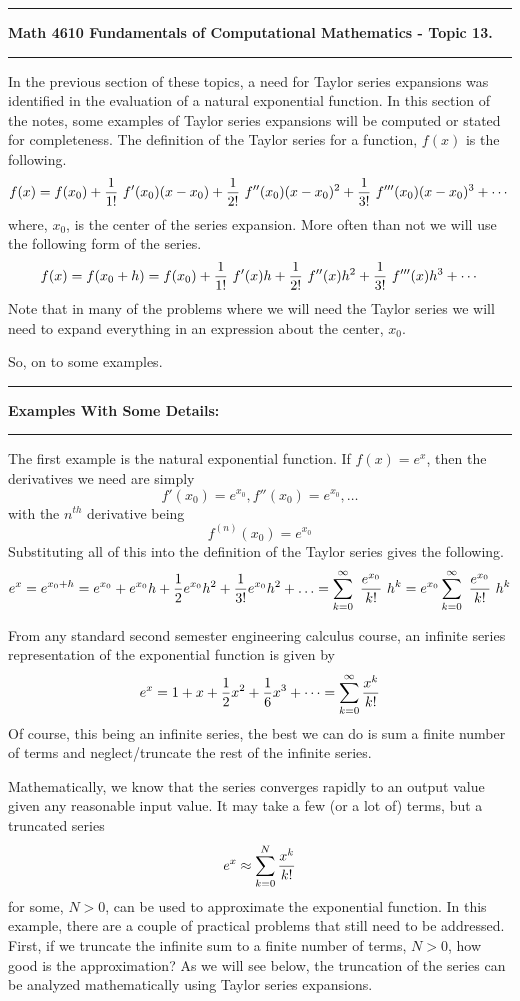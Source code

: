 \documentclass[10pt,fleqn]{article}
\begin{document}
\vskip0.1in\hrule\vskip0.1in \noindent
{\bf Math 4610 Fundamentals of Computational Mathematics  - Topic 13.}
\vskip0.1in\hrule\vskip0.1in \noindent
In the previous section of these topics, a need for Taylor series expansions
was identified in the evaluation of a natural exponential function. In this
section of the notes, some examples of Taylor series expansions will be computed
or stated for completeness. The definition of
the Taylor series for a function, \(f(x)\) is the following.
\[
  f(x) = f(x_0)
   + {1\over{1!}}\ f'(x_0) ( x - x_0 ) + {1\over{2!}}\ f''(x_0) ( x - x_0 )^2
   + {1\over{3!}}\ f'''(x_0) ( x - x_0 )^3 + \cdots
\]
where, \(x_0\), is the center of the series expansion. More often than not we
will use the following form of the series.
\[
  f(x) = f(x_0+h) = f(x_0) + {1\over{1!}}\ f'(x) h + {1\over{2!}}\ f''(x) h^2
     + {1\over{3!}}\ f'''(x) h^3 + \cdots
\]
Note that in many of the problems where we will need the Taylor series we will
need to expand everything in an expression about the center, \(x_0\).

So, on to some examples.
\vskip0.1in\hrule\vskip0.1in \noindent
{\bf Examples With Some Details:}
\vskip0.1in\hrule\vskip0.1in \noindent
The first example is the natural exponential function. If \(f(x)=e^x\), then
the derivatives we need are simply
\[
  f'(x_0) = e^{x_0}, f''(x_0)=e^{x_0}, \ldots
\]
with the \(n^{th}\) derivative being
\[
  f^{(n)}(x_0) = e^{x_0}
\]
Substituting all of this into the definition of the Taylor series gives the
following.
\[
  e^x = e^{x_0+h} = e^{x_0} + e^{x_0} h + {1\over 2} e^{x_0} h^2 
            + {1\over {3!}} e^{x_0} h^2 + \ldots
            = \sum_{k=0}^\infty\ {{e^{x_0}}\over{k!}}\ h^k
            = e^{x_0} \sum_{k=0}^\infty\ {{e^{x_0}}\over{k!}}\ h^k
\]


From any standard second semester engineering calculus course, an infinite
series representation of the exponential function is given by
\[
  e^x = 1 + x + {1\over 2} x^2 + {1\over 6} x^3 + \cdots
      = \sum_{k=0}^\infty {{x^k}\over{k!}}
\]
Of course, this being an infinite series, the best we can do is sum a finite
number of terms and neglect/truncate the rest of the infinite series.

Mathematically, we know that the series converges rapidly to an output value
given any reasonable input value. It may take a few (or a lot of) terms, but a
truncated series
\[
  e^x \approx \sum_{k=0}^N {{x^k}\over{k!}}
\]
for some, \(N>0\), can be used to approximate the exponential function. In this
example, there are a couple of practical problems that still need to be
addressed. First, if we truncate the infinite sum to a finite number of terms,
\(N>0\), how good is the approximation? As we will see below, the truncation of
the series can be analyzed mathematically using Taylor series expansions.
\end{document}
